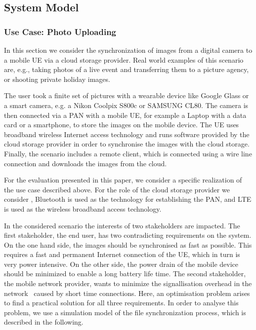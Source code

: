 \subsection{System Model}\label{sec:application:cloud_file_synchronisation:system_model}
\subsubsection*{Use Case: Photo Uploading}\label{sec:application:cloud_file_synchronisation:use_case}
In this section we consider the synchronization of images from a digital camera to a mobile \gls{UE} via a cloud storage provider.
Real world examples of this scenario are, e.g., taking photos of a live event and transferring them to a picture agency, or shooting private holiday images. 

The user took a finite set of pictures with a wearable device like Google Glass or a smart camera, e.g. a Nikon Coolpix S800c or SAMSUNG CL80.
The camera is then connected via a \gls{PAN} with a mobile \gls{UE}, for example a Laptop with a data card or a smartphone, to store the images on the mobile device.
The \gls{UE} uses broadband wireless Internet access technology and runs software provided by the cloud storage provider in order to synchronise the images with the cloud storage.
Finally, the scenario includes a remote client, which is connected using a wire line connection and downloads the images from the cloud.

For the evaluation presented in this paper, we consider a specific realization of the use case described above.
For the role of the cloud storage provider we consider \dropbox, Bluetooth is used as the technology for establishing the \gls{PAN}, and \gls{LTE} is used as the wireless broadband access technology.

In the considered scenario the interests of two stakeholders are impacted.
The first stakeholder, the end user, has two contradicting requirements on the system.
On the one hand side, the images should be synchronised as fast as possible. 
This requires a fast and permanent Internet connection of the \gls{UE}, which in turn is very power intensive.
On the other side, the power drain of the mobile device should be minimized to enable a long battery life time.
The second stakeholder, the mobile network provider, wants to minimize the signallisation overhead in the network~\cite{NSN2011, Huawei2011} caused by short time connections.
Here, an optimisation problem arises to find a practical solution for all three requirements. 
In order to analyse this problem, we use a simulation model of the file synchronization process, which is described in the following.

